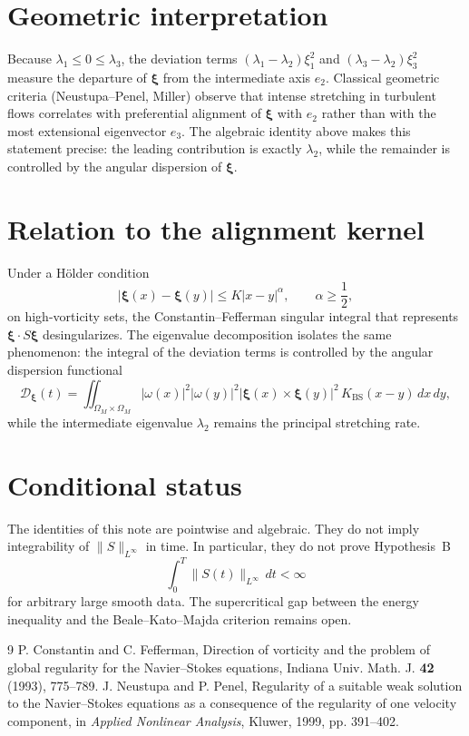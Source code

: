 \documentclass[11pt,a4paper]{article}
\begin{document}
\section{Geometric interpretation}

Because \(\lambda_1\le 0\le\lambda_3\), the deviation terms \((\lambda_1-\lambda_2)\xi_1^2\) and \((\lambda_3-\lambda_2)\xi_3^2\) measure the departure of \(\boldsymbol{\xi}\) from the intermediate axis \(e_2\). Classical geometric criteria (Neustupa--Penel, Miller) observe that intense stretching in turbulent flows correlates with preferential alignment of \(\boldsymbol{\xi}\) with \(e_2\) rather than with the most extensional eigenvector \(e_3\). The algebraic identity above makes this statement precise: the leading contribution is exactly \(\lambda_2\), while the remainder is controlled by the angular dispersion of \(\boldsymbol{\xi}\).

\section{Relation to the alignment kernel}

Under a Hölder condition
\[
|\boldsymbol{\xi}(x)-\boldsymbol{\xi}(y)|\le K|x-y|^\alpha,\qquad\alpha\ge\frac12,
\]
on high-vorticity sets, the Constantin--Fefferman singular integral that represents \(\boldsymbol{\xi}\cdot S\boldsymbol{\xi}\) desingularizes. The eigenvalue decomposition isolates the same phenomenon: the integral of the deviation terms is controlled by the angular dispersion functional
\[
\mathcal{D}_{\boldsymbol{\xi}}(t)=\iint_{\Omega_M\times\Omega_M}|\omega(x)|^2|\omega(y)|^2|\boldsymbol{\xi}(x)\times\boldsymbol{\xi}(y)|^2\,K_{\mathrm{BS}}(x-y)\,dx\,dy,
\]
while the intermediate eigenvalue \(\lambda_2\) remains the principal stretching rate.

\section{Conditional status}

The identities of this note are pointwise and algebraic. They do not imply integrability of \(\|S\|_{L^\infty}\) in time. In particular, they do not prove Hypothesis~B
\[
\int_0^T\|S(t)\|_{L^\infty}\,dt<\infty
\]
for arbitrary large smooth data. The supercritical gap between the energy inequality and the Beale--Kato--Majda criterion remains open.

\begin{thebibliography}{9}
 P. Constantin and C. Fefferman, Direction of vorticity and the problem of global regularity for the Navier--Stokes equations, Indiana Univ. Math. J. \textbf{42} (1993), 775--789.
 J. Neustupa and P. Penel, Regularity of a suitable weak solution to the Navier--Stokes equations as a consequence of the regularity of one velocity component, in \emph{Applied Nonlinear Analysis}, Kluwer, 1999, pp. 391--402.
\end{thebibliography}
\end{document}
